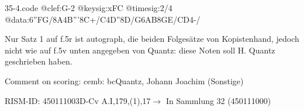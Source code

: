 \documentclass[a4paper, twocolumn, 11pt]{book}
\begin{document}
\begin{filecontents*}{35-4.code}
@clef:G-2
@keysig:xFC
@timesig:2/4
@data:6''{FG}/8A4B'''8C+/C4D''8D/{G6AB}{8GE}/{CD}4-/
\end{filecontents*}
\newline %
\par Nur Satz 1 auf f.5r ist autograph, die beiden Folgesätze von Kopistenhand, jedoch nicht wie auf f.5v unten angegeben von Quantz: {\textquotedbl}diese Noten soll H. Quantz geschrieben haben.{\textquotedbl}
\par Comment on scoring: cemb: bc\newline Quantz, Johann Joachim  (Sonstige)
\par RISM-ID: 450111003\newline D-Cv  A.I,179,(1),17\newline $\rightarrow$ In Sammlung 32 (450111000)
      
\end{document}
